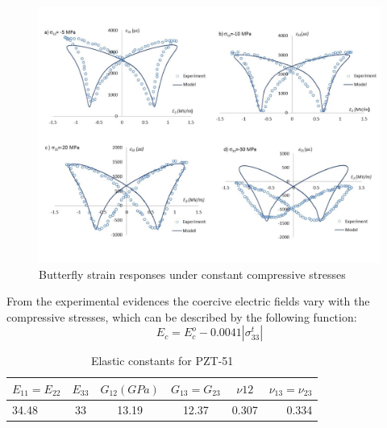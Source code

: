 \begin{figure}
\centering 
\includegraphics[width=6.0in]{./chap_2_pol_sw/figures/butterfly_strain_responses_under_constant_compressive_stresses.pdf} 
\caption{Butterfly strain responses under constant compressive stresses}
\label{butterfly_strain_responses_under_constant_compressive_stresses}
\end{figure}
From the experimental evidences the coercive electric fields vary with the compressive stresses, which can be described by the following function:
\begin{equation}  
{E_c} = E_c^o - 0.0041\left| {\sigma _{33}^t} \right|
\label{EQN:effect_of_stress_on_coercive_field}
\end{equation}

\begin{table}
\caption{Elastic constants for PZT-51 \cite{Muliana2011}}
\centering
\begin{tabular}{l c c c c r} 
\hline 
$E_{11}=E_{22}$ & $E_{33}$& $G_{12}(GPa)$&$G_{13}=G_{23}$ & $\nu{12}$& $\nu_{13}=\nu_{23} $ \\  \hline
34.48 & 33 & 13.19 &12.37 & 0.307 & 0.334 \\  \hline
\end{tabular}
\label{table:MatPZT_51_Elastic_constants} 
\end{table}

